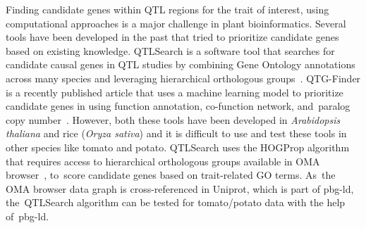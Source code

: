 \documentclass[applsci,article,accept,moreauthors,pdftex]{Definitions/mdpi}
\begin{document}
{Finding candidate genes within QTL regions for the trait of interest, using computational approaches is a major challenge in plant bioinformatics. Several tools have been developed in the past that tried to prioritize candidate genes based on existing knowledge. QTLSearch is a software tool that searches for candidate causal genes in QTL studies by combining Gene Ontology annotations across many species and leveraging hierarchical orthologous groups~\cite{warwick2018prioritising}. QTG-Finder is a recently published article that uses a machine learning model to prioritize candidate genes in using function annotation, co-function network, and~paralog copy number~\cite{lin2019qtg}. However, both these tools have been developed in \textit{Arabidopsis thaliana} and rice (\textit{Oryza sativa}) and it is difficult to use and test these tools in other species like tomato and potato. QTLSearch uses the HOGProp algorithm that requires access to hierarchical orthologous groups available in OMA browser~\cite{schneider2007oma}, to~score candidate genes based on trait-related GO terms. As~the OMA browser data graph is cross-referenced in Uniprot, which is part of pbg-ld, the~QTLSearch algorithm can be tested for tomato/potato data with the help of~pbg-ld.



}
\end{document}
